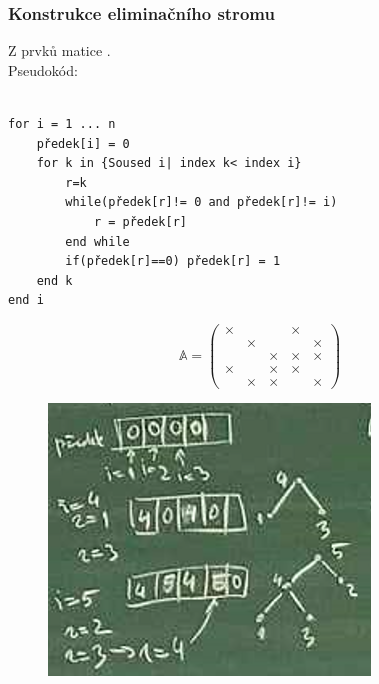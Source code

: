 \documentclass[../main.tex]{subfiles}
\begin{document}
\subsubsection{Konstrukce eliminačního stromu}

Z prvků matice \matA.\\Pseudokód:

\begin{minipage}{0.95\linewidth}
\begin{verbatim}
    
for i = 1 ... n
    předek[i] = 0
    for k in {Soused i| index k< index i} 
        r=k
        while(předek[r]!= 0 and předek[r]!= i)
            r = předek[r]
        end while
        if(předek[r]==0) předek[r] = 1
    end k 
end i
\end{verbatim}    
\end{minipage}


\begin{example}
    \begin{equation*}
        \mathbb{A} = \begin{pmatrix}
            \times &&&\times&\\
            &\times&&&\times\\
            &&\times&\times&\times\\
            \times&&\times&\times&\\
            &\times&\times&&\times
        \end{pmatrix}
    \end{equation*}

    \begin{figure}[H]
        \centering
        \includegraphics{images/26-10-elimstrompostup.png}
    \end{figure}
\end{example}
\end{document}
